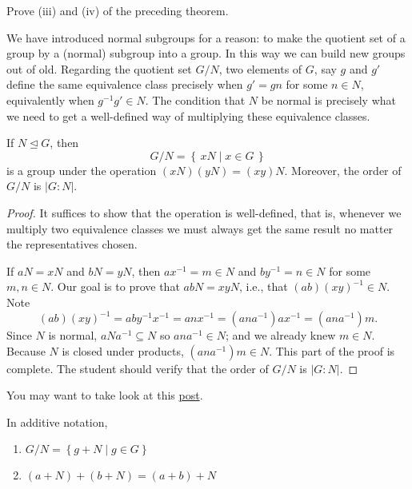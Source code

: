 \documentclass[11pt,a4paper]{article}
\begin{document}
\begin{eje}
    Prove (iii) and (iv) of the preceding theorem.
\end{eje}
 
We have introduced normal subgroups for a reason: to make the quotient set of a group by a (normal) subgroup into a group.
In this way we can build new groups out of old.
Regarding the quotient set \(G/N\), two elements of  \(G\), say \(g\) and \(g'\) define the same equivalence class precisely when \(g' = gn\)  for some \(n\in N\), equivalently when \(g^{-1} g'  \in N\).
The condition that \(N\) be normal is precisely what we need to get a well-defined way of multiplying these equivalence classes.

\begin{teo}
    If \(N\unlhd G\), then 
    \[G/N = \left\{ \,xN \mid x \in G \,\right\}\]
    is a group under the operation \((xN)(yN) = (xy) N\).
    Moreover, the order of \(G/N\) is \(|G: N|\).
\end{teo}

\begin{proof}
It suffices to show that the operation is well-defined, that is, whenever we multiply two equivalence classes we must always get the same result no matter the representatives chosen.

If \(aN = xN\) and \(bN= yN\), then \(ax^{-1} = m \in N\) and \(by^{-1} = n \in N\) for some \(m,n\in N\).
Our goal is to prove that \(ab N = xy N\), i.e., that \((ab)(xy)^{-1}\in N\).
Note \[(ab)(xy)^{-1}=aby^{-1}x^{-1} = anx^{-1} = (an a^{-1})a x^{-1} =(an a^{-1}) m.\]
Since \(N\) is normal, \(aNa^{-1} \subseteq  N\) so \(ana^{-1} \in N\); and we already knew \(m\in N\).
Because \(N\) is closed under products, \((an a^{-1}) m \in N\).
This part of the  proof is complete.
The student should verify that the order of \(G/N\) is \(|G: N|\).
\end{proof}

You may want to take look at this \href{https://math.stackexchange.com/questions/14282/why-do-we-define-quotient-groups-for-normal-subgroups-only}{post}.


\begin{rem}
In additive notation, 
\begin{enumerate}[label=(\roman*)]
    \item \(G/N = \left\{ g+N \mid g\in G \right\}\)
    \item \((a+N)+(b+N) = (a+b) + N\)
\end{enumerate}
\end{rem}
\end{document}
